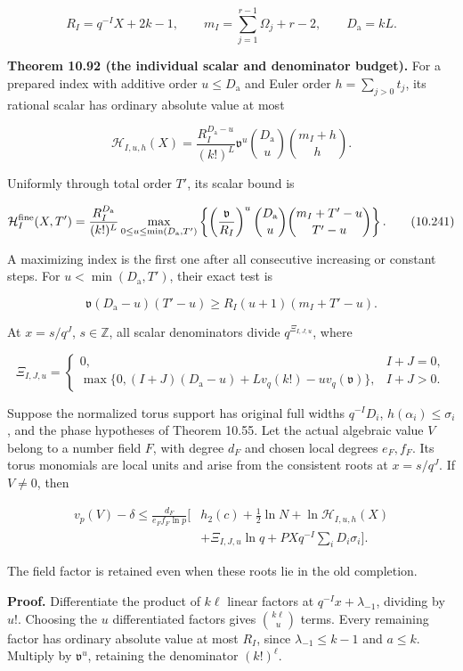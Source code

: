 \documentclass[
  11pt,
  a4paper,
]{article}
\begin{document}
\[
R_I=q^{-I}X+2k-1,\qquad
m_I=\sum_{j=1}^{r-1}\Omega_j+r-2,\qquad D_{\mathrm a}=kL.
\tag{10.239}
\]

\textbf{Theorem 10.92 (the individual scalar and denominator budget).}
For a prepared index with additive order \(u\le D_{\mathrm a}\) and
Euler order \(h=\sum_{j>0}t_j\), its rational scalar has ordinary
absolute value at most

\[
\mathcal H_{I,u,h}(X)=
\frac{R_I^{D_{\mathrm a}-u}}{(k!)^L}
\mathfrak v^u\binom{D_{\mathrm a}}u
\binom{m_I+h}{h}.
\tag{10.240}
\]

Uniformly through total order \(T'\), its scalar bound is

\[
\mathcal H_I^{\rm fine}(X,T')=
\frac{R_I^{D_{\mathrm a}}}{(k!)^L}
\max_{0\le u\le\min(D_{\mathrm a},T')}
\left\{\left(\frac{\mathfrak v}{R_I}\right)^u
\binom{D_{\mathrm a}}u\binom{m_I+T'-u}{T'-u}\right\}.
\tag{10.241}
\]

A maximizing index is the first one after all consecutive increasing or
constant steps. For \(u<\min(D_{\mathrm a},T')\), their exact test is

\[
\mathfrak v(D_{\mathrm a}-u)(T'-u)
\ge R_I(u+1)(m_I+T'-u).
\tag{10.242}
\]

At \(x=s/q^J\), \(s\in\mathbb Z\), all scalar denominators divide
\(q^{\Xi_{I,J,u}}\), where

\[
\Xi_{I,J,u}=
\begin{cases}
0,&I+J=0,\\
\max\{0,(I+J)(D_{\mathrm a}-u)+Lv_q(k!)-u v_q(\mathfrak v)\},
&I+J>0.
\end{cases}
\tag{10.243}
\]

Suppose the normalized torus support has original full widths
\(q^{-I}D_i\), \(h(\alpha_i)\le\sigma_i\), and the phase hypotheses of
Theorem 10.55. Let the actual algebraic value \(V\) belong to a number
field \(F\), with degree \(d_F\) and chosen local degrees \(e_F,f_F\).
Its torus monomials are local units and arise from the consistent roots
at \(x=s/q^J\). If \(V\ne0\), then

\[
\begin{aligned}
v_p(V)-\delta\le\frac{d_F}{e_Ff_F\ln p}\biggl[
&h_2(c)+\tfrac12\ln N+\ln\mathcal H_{I,u,h}(X)\\
&+\Xi_{I,J,u}\ln q
+P Xq^{-I}\sum_iD_i\sigma_i\biggr].
\end{aligned}
\tag{10.244}
\]

The field factor is retained even when these roots lie in the old
completion.

\textbf{Proof.} Differentiate the product of \(k\ell\) linear factors at
\(q^{-I}x+\lambda_{-1}\), dividing by \(u!\). Choosing the \(u\)
differentiated factors gives \(\binom{k\ell}u\) terms. Every remaining
factor has ordinary absolute value at most \(R_I\), since
\(\lambda_{-1}\le k-1\) and \(a\le k\). Multiply by \(\mathfrak v^u\),
retaining the denominator \((k!)^\ell\).
\end{document}
